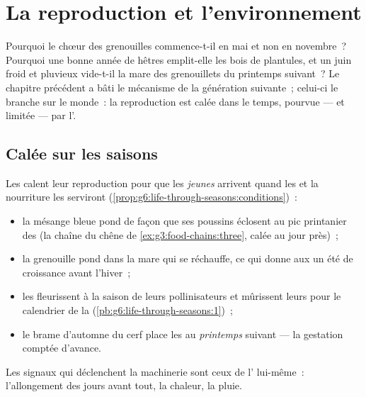 \chapter{La reproduction et l'environnement}\label{ch:g8:reproduction-and-environment}

Pourquoi le chœur des grenouilles commence-t-il en mai et non en
novembre~? Pourquoi une bonne année de hêtres emplit-elle les bois
de plantules, et un juin froid et pluvieux vide-t-il la mare des
grenouillets du printemps suivant~? Le chapitre précédent a bâti le
mécanisme de la génération suivante~; celui-ci le branche sur le
monde~: la reproduction est calée dans le temps, pourvue --- et
limitée --- par l'.

\section{Calée sur les saisons}

\begin{proposition}\label{prop:g8:reproduction-and-environment:timing}
Les  calent leur reproduction pour que les \emph{jeunes}
arrivent quand les  et la nourriture les serviront
(\cref{prop:g6:life-through-seasons:conditions})~:
\begin{itemize}
  \item la mésange bleue pond de façon que ses poussins éclosent au
        pic printanier des  (la chaîne du chêne de
        \cref{ex:g3:food-chains:three}, calée au jour près)~;
  \item la grenouille pond dans la mare qui se réchauffe, ce qui
        donne aux  un été de croissance avant l'hiver~;
  \item les  fleurissent à la saison de leurs pollinisateurs
        et mûrissent leurs  pour le calendrier de la
         (\cref{pb:g6:life-through-seasons:1})~;
  \item le brame d'automne du cerf place les  au
        \emph{printemps} suivant --- la gestation comptée d'avance.
\end{itemize}
Les signaux qui déclenchent la machinerie sont ceux de
l' lui-même~: l'allongement des jours avant tout, la
chaleur, la pluie.
\end{proposition}
\admitted

